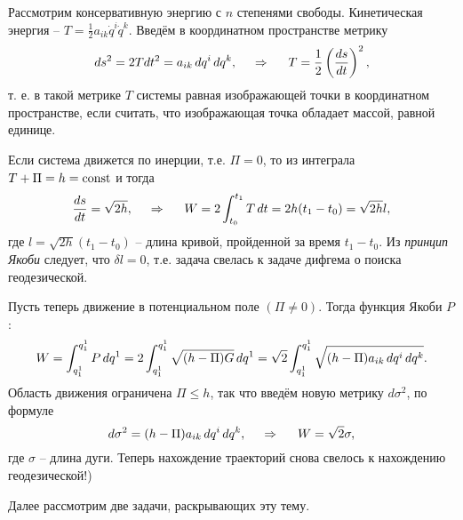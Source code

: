 Рассмотрим консервативную энергию с $n$ степенями свободы. Кинетическая энергия -- $T = \frac{1}{2} a_{ik} \dot{q}^i \dot{q}^k$. Введём в координатном пространстве метрику
\begin{equation*}
    ds^2 = 2 T dt^2 = a_{ik} \, d q^i \, d q^k,
    \hspace{0.5cm} \Rightarrow \hspace{0.5cm} 
    T = \frac{1}{2} \left(\frac{d s}{d t} \right)^2,
\end{equation*}
т. е. в такой метрике $T$ системы равная изображающей точки в координатном пространстве, если считать, что изображающая точка обладает массой, равной единице.

Если система движется по инерции, т.е. $\Pi = 0$, то из интеграла $T + \Pi = h = \text{const}$ и тогда
\begin{equation*}
    \frac{d s}{d t} = \sqrt{2 h},
    \hspace{0.5cm} \Rightarrow \hspace{0.5cm} 
    W = 2 \int_{t_0}^{t_1} T \, d t = 2 h (t_1 - t_0) = \sqrt{2h} l,
\end{equation*}
где $l = \sqrt{2h} (t_1-t_0)$ -- длина кривой, пройденной за время $t_1-t_0$. Из \textit{принцип Якоби} следует, что $\delta l = 0$, т.е. задача свелась к задаче дифгема о поиска геодезической.

Пусть теперь движение в потенциальном поле $(\Pi \neq 0)$. Тогда функция Якоби $P$:
\begin{equation*}
    W = \int_{q^{1}_1}^{q_1^1} P \, d q^1 = 
    2 \int_{q^{1}_1}^{q_1^1}
    \sqrt{ (h - \Pi) G} \, d q^1 
    =
    \sqrt{2} \int_{q^{1}_1}^{q_1^1} 
    \sqrt{
        (h-\Pi) a_{ik} \, d q^i \, d q^k
    }.
\end{equation*}
Область движения ограничена $\Pi \leq h$, так что введём новую метрику $d \sigma^2$, по формуле
\begin{equation*}
    d \sigma^2 = (h - \Pi) a_{ik} \, d q^i \, d q^k,
    \hspace{0.5cm} \Rightarrow \hspace{0.5cm} 
    W = \sqrt{2} \sigma,
\end{equation*}
где $\sigma$ -- длина дуги. Теперь нахождение траекторий снова свелось к нахождению геодезической!)

Далее рассмотрим две задачи, раскрывающих эту тему.













